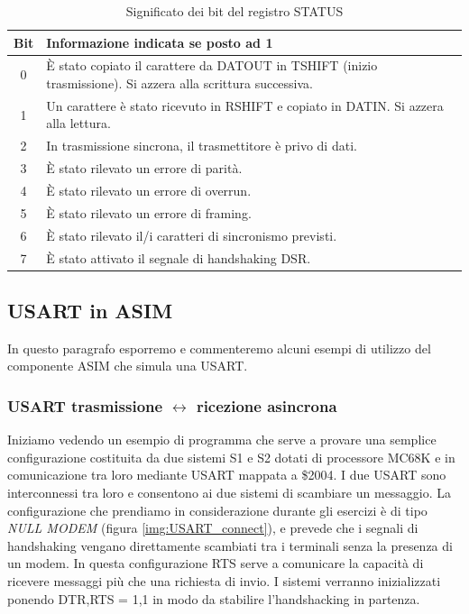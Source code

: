 \begin{table}[ht]
    \centering
    \begin{tabular}{|c|p{11cm}|}
    \hline
    \textbf{Bit} & \textbf{Informazione indicata se posto ad 1} \\
    \hline
    0 & È stato copiato il carattere da DATOUT in TSHIFT (inizio trasmissione). Si azzera alla scrittura successiva. \\
    1 & Un carattere è stato ricevuto in RSHIFT e copiato in DATIN. Si azzera alla lettura. \\
    2 & In trasmissione sincrona, il trasmettitore è privo di dati. \\
    3 & È stato rilevato un errore di parità. \\
    4 & È stato rilevato un errore di overrun. \\
    5 & È stato rilevato un errore di framing. \\
    6 & È stato rilevato il/i caratteri di sincronismo previsti. \\
    7 & È stato attivato il segnale di handshaking DSR. \\
    \hline
    \end{tabular}
    \caption{Significato dei bit del registro STATUS}\label{tab:STAT-8251}
\end{table}
    
\subsection{USART in ASIM}
In questo paragrafo esporremo e commenteremo alcuni esempi di utilizzo del componente ASIM che simula una USART.

\subsubsection{USART trasmissione $\leftrightarrow$ ricezione asincrona}
Iniziamo vedendo un esempio di programma che serve a provare una semplice configurazione costituita da due sistemi S1 e S2 dotati di processore MC68K e in comunicazione tra loro mediante USART mappata a \$2004. I due USART sono interconnessi tra loro e consentono ai due sistemi di scambiare un messaggio.
La configurazione che prendiamo in considerazione durante gli esercizi è di tipo \textit{NULL MODEM} (figura \ref{img:USART_connect}), e prevede che i segnali di handshaking vengano direttamente scambiati tra i terminali senza la presenza di un modem. In questa configurazione RTS serve a comunicare la capacità di ricevere messaggi più che una richiesta di invio. I sistemi verranno inizializzati ponendo DTR,RTS = 1,1 in modo da stabilire l'handshacking in partenza.

